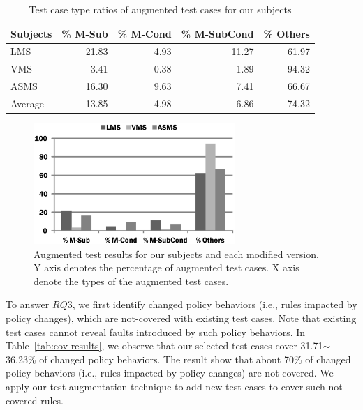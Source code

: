 \begin{table}[htbp]
  \centering
  \caption{Test case type ratios of augmented test cases for our subjects}
    \begin{tabular}{|l|r|r|r|r|}
		\hline
    Subjects & \% M-Sub & \% M-Cond & \% M-SubCond  & \% Others \\\hline\hline
    LMS   & 21.83 & 4.93  & 11.27 & 61.97 \\\hline
    VMS   & 3.41  & 0.38  & 1.89  & 94.32 \\\hline
    ASMS  & 16.30 & 9.63  & 7.41  & 66.67 \\\hline\hline
    Average & 13.85 & 4.98  & 6.86  & 74.32 \\\hline
    \end{tabular}%
  \label{tab:augment-results}%
\end{table}%
 \vspace{-20pt}
\begin{figure}[htbp]
    \centering
        \includegraphics[width=3.0in]{augmenttypes.eps}
        \vspace{-5pt}
    \caption{\label{fig:augment-results} Augmented test results for our subjects and each modified version. Y axis
    denotes the percentage of augmented test cases. X axis denote the types of the augmented test cases.}
    \vspace{-10pt}
\end{figure}


To answer $RQ3$, we first identify
changed policy behaviors (i.e., rules impacted by policy changes), which
are not-covered with existing test cases.
Note that existing test cases cannot reveal faults introduced by such policy behaviors.
In Table~\ref{tab:cov-results}, we observe that our selected test cases
cover 31.71$\sim$36.23\% of changed policy behaviors. The result show
that about 70\% of changed policy behaviors (i.e., rules impacted by policy changes) are not-covered.
We apply our test augmentation technique to add new test cases
to cover such not-covered-rules.

